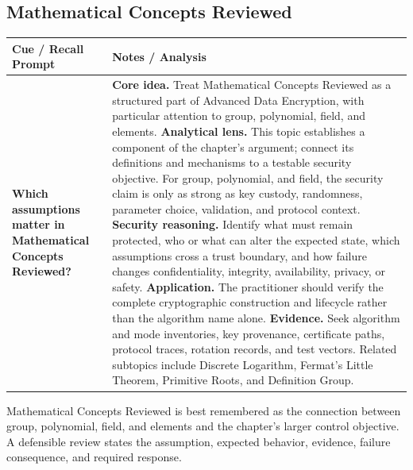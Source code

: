 \documentclass[11pt]{article}
\newcommand{\CornellHeader}{%
\rowcolor{Navy}\color{white}\bfseries Cue / Recall Prompt & \color{white}\bfseries Notes / Analysis\\\hline}
\newcommand{\CornellRow}[2]{%
\cellcolor{CueGray}\RaggedRight\textbf{#1} & \RaggedRight #2\\\hline}
\begin{document}
\subsection*{Mathematical Concepts Reviewed}
\begin{longtable}{>{\RaggedRight\arraybackslash}p{}|>{\RaggedRight\arraybackslash}p{}}
\CornellHeader
\CornellRow{Which assumptions matter in Mathematical Concepts Reviewed?}{\textbf{Core idea.} Treat Mathematical Concepts Reviewed as a structured part of Advanced Data Encryption, with particular attention to group, polynomial, field, and elements. \textbf{Analytical lens.} This topic establishes a component of the chapter's argument; connect its definitions and mechanisms to a testable security objective. For group, polynomial, and field, the security claim is only as strong as key custody, randomness, parameter choice, validation, and protocol context. \textbf{Security reasoning.} Identify what must remain protected, who or what can alter the expected state, which assumptions cross a trust boundary, and how failure changes confidentiality, integrity, availability, privacy, or safety. \textbf{Application.} The practitioner should verify the complete cryptographic construction and lifecycle rather than the algorithm name alone. \textbf{Evidence.} Seek algorithm and mode inventories, key provenance, certificate paths, protocol traces, rotation records, and test vectors. Related subtopics include Discrete Logarithm, Fermat's Little Theorem, Primitive Roots, and Definition Group.}
\end{longtable}
\begin{topicsummary}
Mathematical Concepts Reviewed is best remembered as the connection between group, polynomial, field, and elements and the chapter's larger control objective. A defensible review states the assumption, expected behavior, evidence, failure consequence, and required response.
\end{topicsummary}
\end{document}
